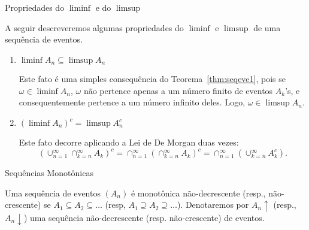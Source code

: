 \begin{frame}

\begin{block}{Propriedades do $\liminf$ e do $\limsup$}


A seguir descreveremos algumas propriedades do $\liminf$ e $\limsup$
de uma sequência de eventos.

\begin{enumerate}
\item $\liminf A_n \subseteq \limsup A_n$

Este fato é uma simples consequência do Teorema~\ref{thm:seqeve1},
pois se $\omega\in \liminf A_n$, $\omega$ não pertence apenas a um
número finito de eventos $A_k$'s, e consequentemente pertence a um
número infinito deles. Logo, $\omega\in \limsup A_n$.

\item $(\liminf A_n)^c=\limsup A_n^c$

Este fato decorre aplicando a Lei de De Morgan duas vezes:
%
$$(\cup_{n=1}^{\infty}\cap_{k=n}^{\infty}A_k)^c=\cap_{n=1}^{\infty}(\cap_{k=n}^{\infty}A_k)^c=\cap_{n=1}^{\infty}(\cup_{k=n}^{\infty}A_k^c).$$
\end{enumerate}

\end{block}

\begin{block}{Sequências Monotônicas}

Uma sequência de eventos $(A_n)$ é monotônica não-decrescente
(resp., não-crescente) se $A_1\subseteq A_2\subseteq \ldots$ (resp,
$A_1\supseteq A_2\supseteq \ldots$). Denotaremos por $A_n\uparrow$
(resp., $A_n\downarrow$) uma sequência não-decrescente (resp.
não-crescente) de eventos.

\end{block}
\end{frame}
%
